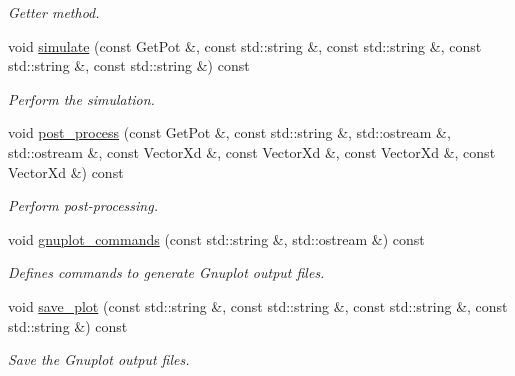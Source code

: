 \begin{DoxyCompactItemize}
\begin{DoxyCompactList}\small\item\em Getter method. \end{DoxyCompactList}\item 
void \hyperlink{classDosModel_a5203629bc44905401b1b0d71a021db40}{simulate} (const Get\-Pot \&, const std\-::string \&, const std\-::string \&, const std\-::string \&, const std\-::string \&) const 
\begin{DoxyCompactList}\small\item\em Perform the simulation. \end{DoxyCompactList}\item 
void \hyperlink{classDosModel_a16cf4bc9c1a053efd9a2f1b607fd0643}{post\-\_\-process} (const Get\-Pot \&, const std\-::string \&, std\-::ostream \&, std\-::ostream \&, const Vector\-Xd \&, const Vector\-Xd \&, const Vector\-Xd \&, const Vector\-Xd \&) const 
\begin{DoxyCompactList}\small\item\em Perform post-\/processing. \end{DoxyCompactList}\item 
void \hyperlink{classDosModel_a26e64253688b5b51ffc54013bf3bc553}{gnuplot\-\_\-commands} (const std\-::string \&, std\-::ostream \&) const 
\begin{DoxyCompactList}\small\item\em Defines commands to generate Gnuplot output files. \end{DoxyCompactList}\item 
void \hyperlink{classDosModel_aa614583c066c644e83085beaad05279d}{save\-\_\-plot} (const std\-::string \&, const std\-::string \&, const std\-::string \&, const std\-::string \&) const 
\begin{DoxyCompactList}\small\item\em Save the Gnuplot output files. \end{DoxyCompactList}\end{DoxyCompactItemize}
